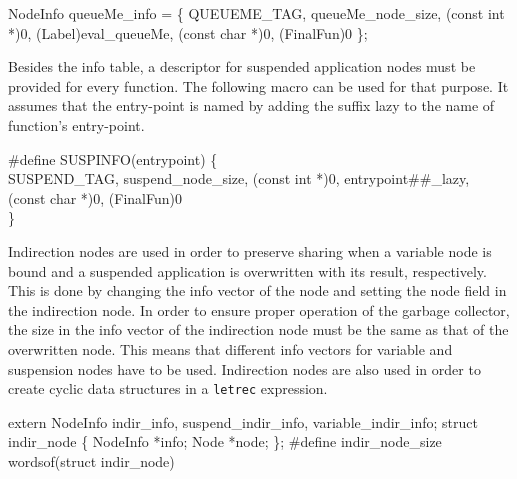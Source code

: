 \nwendcode{}\nwdocspar
\nwenddocs{}\plusendmoddef\nwstartdeflinemarkup{}\nwenddeflinemarkup
NodeInfo queueMe_info = \{
    QUEUEME_TAG, queueMe_node_size, (const int *)0, (Label)eval_queueMe,
    (const char *)0, (FinalFun)0
\};

\nwendcode{}\nwdocspar
Besides the info table, a descriptor for suspended application nodes
must be provided for every function. The following macro can be used
for that purpose. It assumes that the entry-point is named by adding
the suffix {\Tt{}{\_}lazy\nwendquote} to the name of function's entry-point.                  %

\nwenddocs{}\plusendmoddef\nwstartdeflinemarkup{}\nwenddeflinemarkup
#define SUSPINFO(entrypoint) \{ \\
    SUSPEND_TAG, suspend_node_size, (const int *)0, entrypoint##_lazy, \\
    (const char *)0, (FinalFun)0 \\
\}

\nwendcode{}\nwdocspar
Indirection nodes are used in order to preserve sharing when a
variable node is bound and a suspended application is overwritten with
its result, respectively. This is done by changing the info vector of
the node and setting the {\Tt{}node\nwendquote} field in the indirection node. In
order to ensure proper operation of the garbage collector, the size in
the info vector of the indirection node must be the same as that of
the overwritten node. This means that different info vectors for
variable and suspension nodes have to be used. Indirection nodes are
also used in order to create cyclic data structures in a \verb|letrec|
expression.

\nwenddocs{}\plusendmoddef\nwstartdeflinemarkup{}\nwenddeflinemarkup
extern NodeInfo indir_info, suspend_indir_info, variable_indir_info;
struct indir_node \{
    NodeInfo *info;
    Node     *node;
\};
#define indir_node_size         wordsof(struct indir_node)

